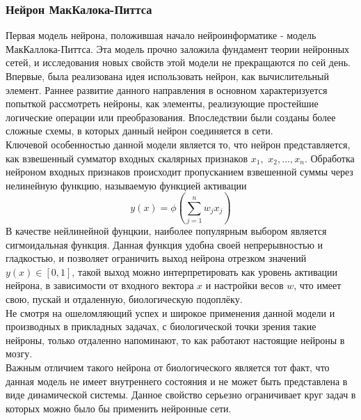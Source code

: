 \documentclass[a4paper,10pt]{article}
\begin{document}
\subsubsection{Нейрон МакКалока-Питтса}
   Первая модель нейрона, положившая начало нейроинформатике  - модель МакКаллока-Питтса. Эта модель прочно заложила фундамент теории нейронных сетей, и исследования новых свойств этой модели не   прекращаются по сей день.\\
   \indent Впервые, была реализована идея использовать нейрон, как вычислительный элемент. Раннее развитие данного направления в основном характеризуется попыткой рассмотреть нейроны, как элементы,        реализующие простейшие логические операции или преобразования. Впоследствии были созданы более сложные схемы, в которых данный нейрон соединяется в сети.\\
   \indent Ключевой особенностью данной модели является то, что нейрон представляется, как взвешенный сумматор входных скалярных признаков $x_{1},$ $x_{2},...,x_{n}$. Обработка нейроном входных признаков происходит пропусканием взвешенной суммы через нелинейную функцию, называемую функцией активации\\
   \begin{equation}\label{eq:sum_mp}
   y(x) = \phi(\sum_{j=1}^{n}w_{j}x_{j})
   \end{equation}
	\indent В качестве нейлинейной фунцкии, наиболее популярным выбором является сигмоидальная функция\cite{Zaencev1999}. Данная функция удобна своей непрерывностью и гладкостью, и позволяет ограничить выход нейрона  отрезком значений $y(x)\in[0,1]$, такой выход можно интерпретировать как уровень активации нейрона, в зависимости от входного вектора $x$ и настройки весов $w$, что имеет свою, пускай и отдаленную, биологическую подоплёку. \\
   \indent Не смотря на ошеломляющий успех и широкое применения данной модели  и производных в прикладных задачах, с биологической точки зрения такие нейроны, только отдаленно напоминают, то как работают настоящие нейроны в мозгу.\\
   \indent Важным отличием такого нейрона от биологического является тот факт, что данная модель не имеет внутреннего состояния и не может быть представлена в виде динамической системы\cite{Zaencev1999}. Данное свойство серьезно ограничивает круг задач в которых можно было бы применить нейронные сети. 
\end{document}
